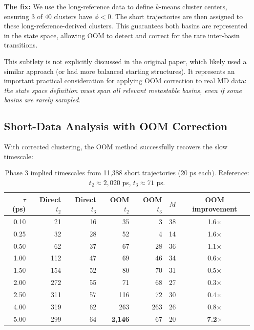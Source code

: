 \documentclass[11pt,a4paper]{article}
\begin{document}
\textbf{The fix:} We use the long-reference data to define $k$-means cluster centers, ensuring 3 of 40 clusters have $\phi < 0$. The short trajectories are then assigned to these long-reference-derived clusters. This guarantees both basins are represented in the state space, allowing OOM to detect and correct for the rare inter-basin transitions.

This subtlety is not explicitly discussed in the original paper, which likely used a similar approach (or had more balanced starting structures). It represents an important practical consideration for applying OOM correction to real MD data: \textit{the state space definition must span all relevant metastable basins, even if some basins are rarely sampled.}

\subsection{Short-Data Analysis with OOM Correction}

With corrected clustering, the OOM method successfully recovers the slow timescale:

\begin{table}[H]
\centering
\caption{Phase 3 implied timescales from 11{,}388 short trajectories (20 ps each). Reference: $t_2 \approx 2{,}020$ ps, $t_3 \approx 71$ ps.}
\label{tab:phase3_results}
\begin{tabular}{rrrrrrc}
\toprule
$\tau$ (ps) & Direct $t_2$ & Direct $t_3$ & OOM $t_2$ & OOM $t_3$ & $M$ & OOM improvement \\
\midrule
0.10 & 21 & 16 & 35 & 3 & 38 & 1.6$\times$ \\
0.25 & 32 & 28 & 52 & 4 & 14 & 1.6$\times$ \\
0.50 & 62 & 37 & 67 & 28 & 36 & 1.1$\times$ \\
1.00 & 112 & 47 & 69 & 46 & 34 & 0.6$\times$ \\
1.50 & 154 & 52 & 80 & 70 & 31 & 0.5$\times$ \\
2.00 & 272 & 55 & 71 & 68 & 27 & 0.3$\times$ \\
2.50 & 311 & 57 & 116 & 72 & 30 & 0.4$\times$ \\
4.00 & 319 & 62 & 263 & 263 & 26 & 0.8$\times$ \\
\rowcolor{yellow!20}
5.00 & 299 & 64 & \textbf{2{,}146} & 67 & 20 & \textbf{7.2$\times$} \\
\bottomrule
\end{tabular}
\end{table}
\end{document}
